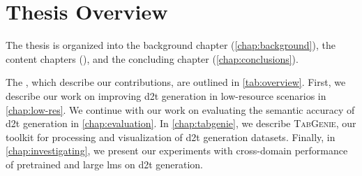 \section{Thesis Overview}
\label{sec:overview}

The thesis is organized into the background chapter (\autoref{chap:background}), the content chapters (), and the concluding chapter (\autoref{chap:conclusions}).

The , which describe our contributions, are outlined in \autoref{tab:overview}. First, we describe our work on improving \ac{d2t} generation in low-resource scenarios in \autoref{chap:low-res}. We continue with our work on evaluating the semantic accuracy of \ac{d2t} generation in \autoref{chap:evaluation}. In \autoref{chap:tabgenie}, we describe \textsc{TabGenie}, our toolkit for processing and visualization of \ac{d2t} generation datasets. Finally, in \autoref{chap:investigating}, we present our experiments with cross-domain performance of pretrained and large \acp{lm} on \ac{d2t} generation.

